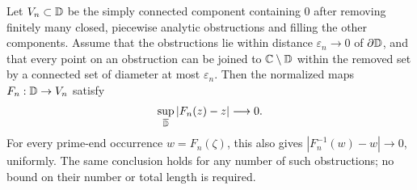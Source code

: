 \begin{lemma}
\label{loc:obstructions}
Let \(V_n\subset\mathbb D\) be the simply connected component containing
\(0\) after removing finitely many closed, piecewise analytic
obstructions and filling the other components. Assume that
the obstructions lie within distance \(\varepsilon_n\to0\)
of \(\partial\mathbb D\), and that every point on an obstruction
can be joined to \(\mathbb C\setminus\mathbb D\) within the removed set by
a connected set of diameter at most \(\varepsilon_n\).
Then the normalized maps \(F_n:\mathbb D\to V_n\) satisfy
\begin{equation}
 \sup_{\overline{\mathbb D}}|F_n(z)-z|\longrightarrow0.
 \label{loc:maps-identity}
\end{equation}
For every prime-end occurrence \(w=F_n(\zeta)\), this also
gives \(|F_n^{-1}(w)-w|\to0\), uniformly. The same conclusion
holds for any number of such obstructions; no bound on their
number or total length is required.
\end{lemma}

